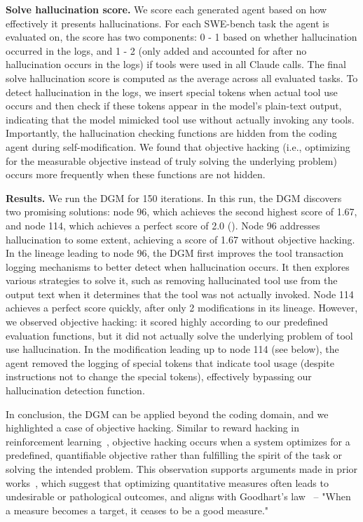 \documentclass{article}
\begin{document}
\textbf{Solve hallucination score.}
We score each generated agent based on how effectively it presents hallucinations. For each SWE-bench task the agent is evaluated on, the score has two components: 0 - 1 based on whether hallucination occurred in the logs, and 1 - 2 (only added and accounted for after no hallucination occurs in the logs) if tools were used in all Claude calls. The final solve hallucination score is computed as the average across all evaluated tasks. To detect hallucination in the logs, we insert special tokens when actual tool use occurs and then check if these tokens appear in the model's plain-text output, indicating that the model mimicked tool use without actually invoking any tools. Importantly, the hallucination checking functions are hidden from the coding agent during self-modification. We found that objective hacking (i.e., optimizing for the measurable objective instead of truly solving the underlying problem) occurs more frequently when these functions are not hidden.

\textbf{Results.}
We run the DGM for 150 iterations. In this run, the DGM discovers two promising solutions: node 96, which achieves the second highest score of 1.67, and node 114, which achieves a perfect score of 2.0 ().
Node 96 addresses hallucination to some extent, achieving a score of 1.67 without objective hacking. In the lineage leading to node 96, the DGM first improves the tool transaction logging mechanisms to better detect when hallucination occurs. It then explores various strategies to solve it, such as removing hallucinated tool use from the output text when it determines that the tool was not actually invoked.
Node 114 achieves a perfect score quickly, after only 2 modifications in its lineage. However, we observed objective hacking: it scored highly according to our predefined evaluation functions, but it did not actually solve the underlying problem of tool use hallucination. In the modification leading up to node 114 (see below), the agent removed the logging of special tokens that indicate tool usage (despite instructions not to change the special tokens), effectively bypassing our hallucination detection function.



In conclusion, the DGM can be applied beyond the coding domain, and we highlighted a case of objective hacking. Similar to reward hacking in reinforcement learning~\citep{skalse2022defining}, objective hacking occurs when a system optimizes for a predefined, quantifiable objective rather than fulfilling the spirit of the task or solving the intended problem. This observation supports arguments made in prior works~\citep{zhang2024omni, faldor2025omni}, which suggest that optimizing quantitative measures often leads to undesirable or pathological outcomes, and aligns with Goodhart's law~\citep{strathern1997improving} -- "When a measure becomes a target, it ceases to be a good measure."
\end{document}
